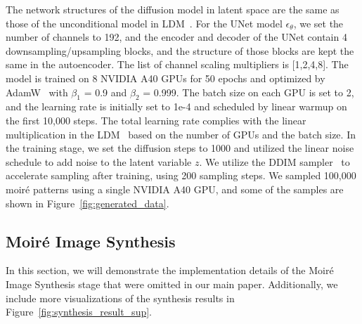The network structures of the diffusion model in latent space are the same as those of the unconditional model in LDM~\cite{Rombach2022LDM}. For the UNet model $\epsilon_\theta$, we set the number of channels to 192, and the encoder and decoder of the UNet contain 4 downsampling/upsampling blocks, and the structure of those blocks are kept the same in the autoencoder. The list of channel scaling multipliers is [1,2,4,8]. 
The model is trained on 8 NVIDIA A40 GPUs for 50 epochs and optimized by AdamW~\cite{loshchilov2019adamw} with $\beta_1$ = 0.9 and $\beta_2$ = 0.999.
The batch size on each GPU is set to 2, and the learning rate is initially set to 1e-4 and scheduled by linear warmup on the first 10,000 steps. The total learning rate complies with the linear multiplication in the LDM~\cite{Rombach2022LDM} based on the number of GPUs and the batch size.
In the training stage, we set the diffusion steps to 1000 and utilized the linear noise schedule to add noise to the latent variable $z$.
We utilize the DDIM sampler~\cite{song2022ddim} to accelerate sampling after training, using 200 sampling steps.
We sampled 100,000 moiré patterns using a single NVIDIA A40 GPU, and some of the samples are shown in Figure~\ref{fig:generated_data}.






\subsection{Moiré Image Synthesis}
In this section, we will demonstrate the implementation details of the Moiré Image Synthesis stage that were omitted in our main paper. Additionally, we include more visualizations of the synthesis results in Figure~\ref{fig:synthesis_result_sup}.

